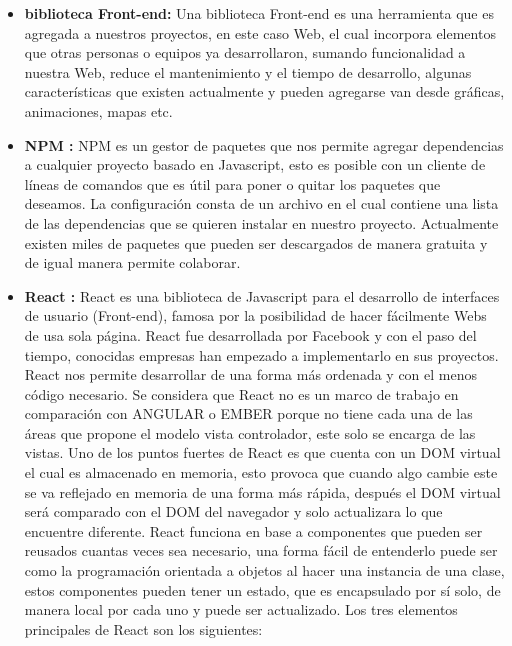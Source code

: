     \begin{itemize}
    
    	\item \textbf{biblioteca Front-end:} Una biblioteca Front-end \cite{frontEnd2}es una herramienta que es agregada a nuestros proyectos, en este caso Web, el cual incorpora elementos que otras personas o equipos ya desarrollaron, sumando funcionalidad a nuestra Web, reduce el mantenimiento y el tiempo de desarrollo, algunas características que existen actualmente y pueden agregarse van desde gráficas, animaciones, mapas etc. 
      
       \item \textbf{NPM :} NPM \cite{npm} es un gestor de paquetes que nos permite agregar dependencias a cualquier proyecto basado en Javascript, esto es posible con un cliente de líneas de comandos que es útil para poner o quitar los paquetes que deseamos. La configuración consta de un archivo en el cual contiene una lista de las dependencias que se quieren instalar en nuestro proyecto. Actualmente existen miles de paquetes que pueden ser descargados de manera gratuita y de igual manera permite colaborar. 
       
       \item \textbf{ React :} React \cite{react} es una biblioteca de Javascript para el desarrollo de interfaces de usuario (Front-end), famosa por la posibilidad de hacer fácilmente Webs de usa sola página. React fue desarrollada por Facebook y con el paso del tiempo, conocidas empresas han empezado a implementarlo en sus proyectos. 
    React nos permite desarrollar de una forma más ordenada y con el menos código necesario. 
    Se considera que React no es un marco de trabajo en comparación con ANGULAR o EMBER porque no tiene cada una de las áreas que propone el modelo vista controlador, este solo se encarga de las vistas. 
    Uno de los puntos fuertes de React es que cuenta con un DOM virtual el cual es almacenado en memoria, esto provoca que cuando algo cambie este se va reflejado en memoria de una forma más rápida, después el DOM virtual será comparado con el DOM del navegador y solo actualizara lo que encuentre diferente. 
    React funciona en base a componentes que pueden ser reusados cuantas veces sea necesario, una forma fácil de entenderlo puede ser como la programación orientada a objetos al hacer una instancia de una clase, estos componentes pueden tener un estado, que es encapsulado por sí solo, de manera local por cada uno y puede ser actualizado.
    Los tres elementos principales de React son los siguientes:
 \begin{itemize}
 

\end{itemize}
\end{itemize}
